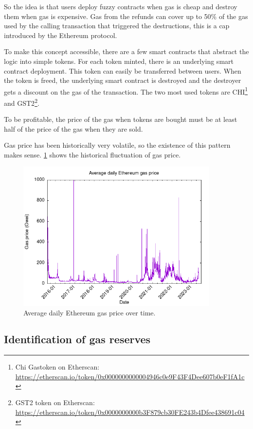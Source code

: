So the idea is that users deploy fuzzy contracts when gas is cheap and destroy them when gas is expensive. Gas from the refunds can cover up to 50\% of the gas used by the calling transaction that triggered the destructions, this is a cap introduced by the Ethereum protocol. 

To make this concept accessible, there are a few smart contracts that abstract the logic into simple tokens. For each token minted, there is an underlying smart contract deployment. This token can easily be transferred between users. When the token is freed, the underlying smart contract is destroyed and the destroyer gets a discount on the gas of the transaction. The two most used tokens are CHI\footnote{Chi Gastoken on Etherscan: \url{https://etherscan.io/token/0x0000000000004946c0e9F43F4Dee607b0eF1fA1c}} and GST2\footnote{GST2 token on Etherscan: \url{https://etherscan.io/token/0x0000000000b3F879cb30FE243b4Dfee438691c04}}.

To be profitable, the price of the gas when tokens are bought must be at least half of the price of the gas when they are sold. 

Gas price has been historically very volatile, so the existence of this pattern makes sense. \cref{fig:gas-price} shows the historical fluctuation of gas price.

\begin{figure}[H]
    \centering
    \includegraphics[width=0.9\textwidth]{Figures/analysis/gas-price.png}
    \caption{Average daily Ethereum gas price over time.}
    \label{fig:gas-price}
\end{figure}

\subsection{Identification of gas reserves}


